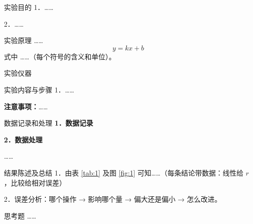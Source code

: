 \documentclass{labreport}        %
\begin{document}
\makecover

\begin{labsection}{实验目的}
1．……\par
2．……
\end{labsection}

\begin{labsection}{实验原理}
……
\begin{equation}
  y = kx + b \label{eq:main}
\end{equation}
式中 ……（每个符号的含义和单位）。
\end{labsection}

\begin{labsection}{实验仪器}
\end{labsection}

\begin{labsection}{实验内容与步骤}
1．……\par
\textbf{注意事项：}……
\end{labsection}

\begin{labsection}{数据记录和处理}
\textbf{1．数据记录}\par
% 

\textbf{2．数据处理}\par
……
\end{labsection}

\begin{labsection}{结果陈述及总结}
1．由表 \ref{tab:1} 及图 \ref{fig:1} 可知……（每条结论带数据：线性给 $r$，比较给相对误差）\par
2．误差分析：哪个操作 → 影响哪个量 → 偏大还是偏小 → 怎么改进。
\end{labsection}

\begin{labsection}{思考题}
……
\end{labsection}

\labcomment
{}

\end{document}
